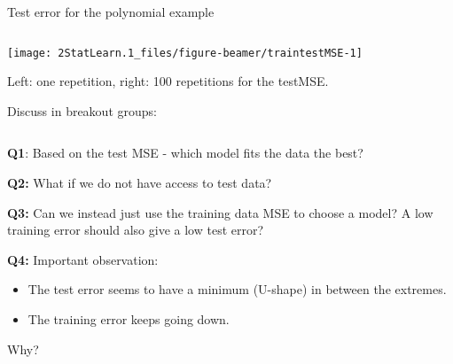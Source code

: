 \documentclass[ignorenonframetext,]{beamer}
\begin{document}
\begin{frame}

\begin{block}{Test error for the polynomial example}

\(~\)

\begin{center}\texttt{[image: 2StatLearn.1\_files/figure-beamer/traintestMSE-1]} \end{center}

Left: one repetition, right: 100 repetitions for the testMSE.

\end{block}

\end{frame}

\begin{frame}

\begin{block}{Discuss in breakout groups:}

\(~\)

\textbf{Q1}: Based on the test MSE - which model fits the data the best?

\vspace{2mm}

\textbf{Q2:} What if we do not have access to test data?

\vspace{2mm}

\textbf{Q3:} Can we instead just use the training data MSE to choose a
model? A low training error should also give a low test error?

\vspace{2mm}

\textbf{Q4:} Important observation:

\vspace{2mm}

\begin{itemize}
\item
  The test error seems to have a minimum (U-shape) in between the
  extremes.
\item
  The training error keeps going down.
\end{itemize}

\centering
\vspace{2mm}

Why?

\end{block}

\end{frame}
\end{document}
